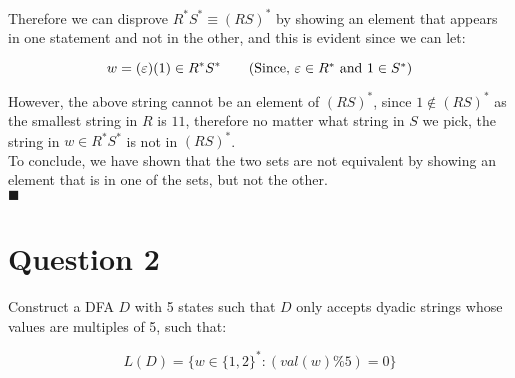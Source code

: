 \documentclass[20pt]{article}
\begin{document}
\begin{enumerate}[label=(\alph*),leftmargin=0cm]
\begin{text}
        Therefore we can disprove $R^*S^* \equiv (RS)^*$ by showing an element that appears in one statement and not in the other, and this is evident since we can let:
    \end{text}
    
    \begin{equation}
        w = (\varepsilon)(1) \in R^{*}S^{*} \tag{Since, $\varepsilon \in R^*$ and $1 \in S^{*}$}
    \end{equation}
    
    \begin{text}
        However, the above string cannot be an element of $(RS)^{*}$, since $1 \notin (RS)^{*}$ as the smallest string in $R$ is $11$, therefore no matter what string in $S$ we pick, the string in $w \in R^{*}S^{*}$ is not in $(RS)^{*}$.\\
        
        To conclude, we have shown that the two sets are not equivalent by showing an element that is in one of the sets, but not the other.\\
        
        \hfill $\blacksquare$
    \end{text}
\end{enumerate}


\newpage

\section*{Question 2}

\begin{text}
    Construct a DFA $D$ with 5 states such that $D$ only accepts dyadic strings whose values are multiples of 5, such that:
\end{text}

\begin{equation}
    L(D) = \{w \in \{1,2\}^{*}:(val(w) \% 5) = 0\} \nonumber
\end{equation}
\end{document}
